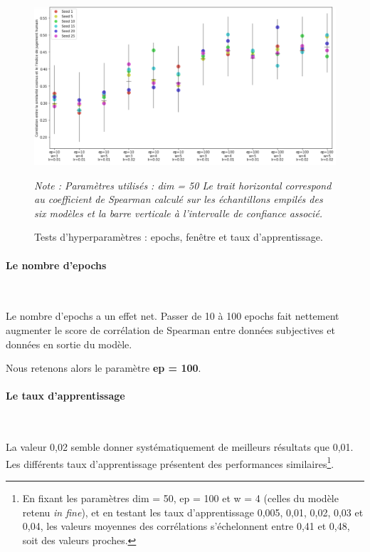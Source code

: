 \documentclass[11pt,french,french]{article}
\let\rmarkdownfootnote\footnote%
\def\footnote{\protect\rmarkdownfootnote}
\begin{document}
\begin{figure}[htp]
\begin{center}
\includegraphics[width=1\textwidth]{img/test_parametres.png}
\captionsetup{margin=0cm,format=hang,justification=justified}
\caption{Tests d'hyperparamètres : epochs, fenêtre et taux d'apprentissage.}\label{fig:evaluation_1}
\end{center}
\vspace{-0.3cm}
\footnotesize
\emph{Note : Paramètres utilisés : dim = 50\newline
Le trait horizontal correspond au coefficient de Spearman calculé sur les échantillons empilés des six modèles et la barre verticale à l'intervalle de confiance associé.}
\end{figure}

\hypertarget{le-nombre-depochs}{%
\paragraph{Le nombre d'epochs}\label{le-nombre-depochs}}

~

Le nombre d'epochs a un effet net. Passer de 10 à 100 epochs fait nettement augmenter le score de corrélation de Spearman entre données subjectives et données en sortie du modèle.

\faArrowCircleRight{} Nous retenons alors le paramètre \textbf{ep = 100}.

\hypertarget{le-taux-dapprentissage}{%
\paragraph{Le taux d'apprentissage}\label{le-taux-dapprentissage}}

~

La valeur 0,02 semble donner systématiquement de meilleurs résultats que 0,01.
Les différents taux d'apprentissage présentent des performances similaires\footnote{En fixant les paramètres dim = 50, ep = 100 et w = 4 (celles du modèle retenu \emph{in fine}), et en testant les taux d'apprentissage 0,005, 0,01, 0,02, 0,03 et 0,04, les valeurs moyennes des corrélations s'échelonnent entre 0,41 et 0,48, soit des valeurs proches.}.
\end{document}
